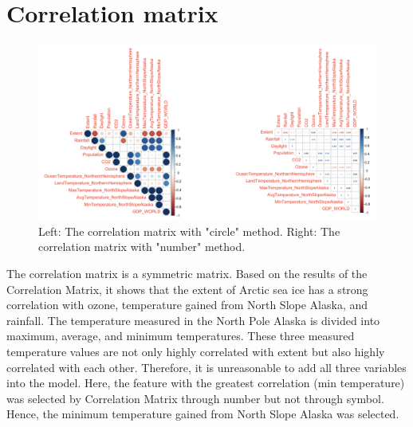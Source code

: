 \section{Correlation matrix} %

\begin{figure}[htbp]
\centering
\includegraphics[width = 1.0\textwidth]{Figure/4.1-CM.png}
\caption{Left: The correlation matrix with "circle" method. Right: The correlation matrix with "number" method.}
\label{4.1-CM}
\end{figure}
The correlation matrix is a symmetric matrix. Based on the results of the Correlation Matrix, it shows that the extent of Arctic sea ice has a strong correlation with ozone, temperature gained from North Slope Alaska, and rainfall. The temperature measured in the North Pole Alaska is divided into maximum, average, and minimum temperatures. These three measured temperature values are not only highly correlated with extent but also highly correlated with each other. Therefore, it is unreasonable to add all three variables into the model. Here, the feature with the greatest correlation (min temperature) was selected by Correlation Matrix through number but not through symbol. Hence, the minimum temperature gained from North Slope Alaska was selected.